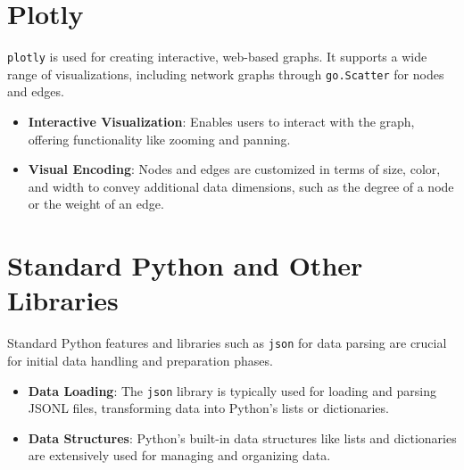 \documentclass[fontsize=11pt]{article}
\begin{document}
\section*{Plotly}

\texttt{plotly} is used for creating interactive, web-based graphs. It supports a wide range of visualizations, including network graphs through \texttt{go.Scatter} for nodes and edges.

\begin{itemize}
    \item \textbf{Interactive Visualization}: Enables users to interact with the graph, offering functionality like zooming and panning.
    \item \textbf{Visual Encoding}: Nodes and edges are customized in terms of size, color, and width to convey additional data dimensions, such as the degree of a node or the weight of an edge.
\end{itemize}

\section*{Standard Python and Other Libraries}

Standard Python features and libraries such as \texttt{json} for data parsing are crucial for initial data handling and preparation phases.

\begin{itemize}
    \item \textbf{Data Loading}: The \texttt{json} library is typically used for loading and parsing JSONL files, transforming data into Python's lists or dictionaries.
    \item \textbf{Data Structures}: Python's built-in data structures like lists and dictionaries are extensively used for managing and organizing data.
\end{itemize}
\end{document}
